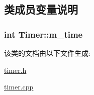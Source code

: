 \subsection{类成员变量说明}
\subsubsection[{\texorpdfstring{m\+\_\+time}{m_time}}]{\setlength{\rightskip}{0pt plus 5cm}int Timer\+::m\+\_\+time}\hypertarget{class_timer_a89e77495174acab64a97e5aa49858cf4}{}\label{class_timer_a89e77495174acab64a97e5aa49858cf4}


该类的文档由以下文件生成\+:\begin{DoxyCompactItemize}
\item 
\hyperlink{timer_8h}{timer.\+h}\item 
\hyperlink{timer_8cpp}{timer.\+cpp}\end{DoxyCompactItemize}

